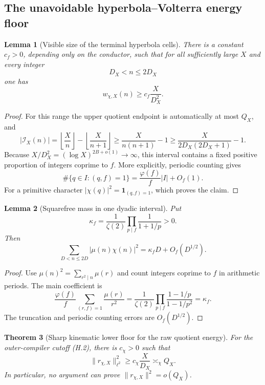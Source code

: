 \documentclass[11pt]{article}
\newtheorem{theorem}{Theorem}[section]
\newtheorem{lemma}[theorem]{Lemma}
\theoremstyle{definition}
\theoremstyle{remark}
\newcommand{\one}{\mathbf 1}
\begin{document}
\subsection{The unavoidable hyperbola--Volterra energy floor}
\label{subsec:hyperbola-energy-floor}

\begin{lemma}[Visible size of the terminal hyperbola cells]
\label{lem:hyperbola-cell-size}
There is a constant \(c_f>0\), depending only on the conductor, such that for
all sufficiently large \(X\) and every integer
\[
 D_X<n\le2D_X
\]
one has
\[
 \boxed{
 w_{\chi,X}(n)
 \ge c_f\frac{X}{D_X^2}.}
 \tag{H.12}
\]
\end{lemma}

\begin{proof}
For this range the upper quotient endpoint is automatically at most \(Q_X\),
and
\[
 |\mathcal I_X(n)|
 =\left\lfloor\frac Xn\right\rfloor
  -\left\lfloor\frac X{n+1}\right\rfloor
 \ge\frac{X}{n(n+1)}-1
 \ge\frac{X}{2D_X(2D_X+1)}-1.
\]
Because \(X/D_X^2=(\log X)^{2B+o(1)}\to\infty\), this interval contains a
fixed positive proportion of integers coprime to \(f\).  More explicitly,
periodic counting gives
\[
 \#\{q\in I:(q,f)=1\}
 =\frac{\varphi(f)}f|I|+O_f(1).
\]
For a primitive character \(|\chi(q)|^2=\one_{(q,f)=1}\), which proves the
claim.
\end{proof}

\begin{lemma}[Squarefree mass in one dyadic interval]
\label{lem:hyperbola-squarefree-mass}
Put
\[
 \kappa_f
 =\frac1{\zeta(2)}
  \prod_{p\mid f}\frac1{1+1/p}>0.
 \tag{H.13}
\]
Then
\[
 \boxed{
 \sum_{D<n\le2D}|\mu(n)\chi(n)|^2
 =\kappa_fD+O_f(D^{1/2}).}
 \tag{H.14}
\]
\end{lemma}

\begin{proof}
Use
\(\mu(n)^2=\sum_{r^2\mid n}\mu(r)\) and count integers coprime to \(f\) in
arithmetic periods.  The main coefficient is
\[
 \frac{\varphi(f)}f
 \sum_{(r,f)=1}\frac{\mu(r)}{r^2}
 =\frac1{\zeta(2)}
  \prod_{p\mid f}\frac{1-1/p}{1-1/p^2}
 =\kappa_f.
\]
The truncation and periodic counting errors are \(O_f(D^{1/2})\).
\end{proof}

\begin{theorem}[Sharp kinematic lower floor for the raw quotient energy]
\label{thm:hyperbola-raw-floor}
For the outer-compiler cutoff \textup{(H.2)}, there is \(c_\chi>0\) such that
\[
 \boxed{
 \|r_{\chi,X}\|_{\ell^2}^2
 \ge c_\chi\frac{X}{D_X}
 \asymp_\chi Q_X.}
 \tag{H.15}
\]
In particular, no argument can prove
\(\|r_{\chi,X}\|^2=o(Q_X)\).
\end{theorem}
\end{document}
